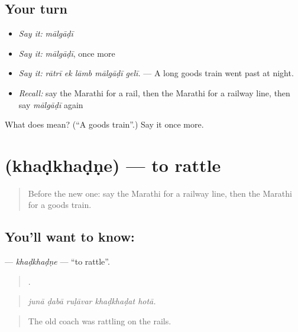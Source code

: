 \subsection*{Your turn}
\begin{itemize}
\raggedright
  \item \emph{Say it:} \emph{mālgāḍī}
  \item \emph{Say it:} \emph{mālgāḍī}, once more
  \item \emph{Say it:} \emph{rātrī ek lāmb mālgāḍī gelī.} — A long goods train went past at night.
  \item \emph{Recall:} say the Marathi for a rail, then the Marathi for a railway line, then say \emph{mālgāḍī} again
\end{itemize}

\begin{tcolorbox}[breakable,colback=teal!4,colframe=teal!35!black,title={Before you move on}]
What does  mean? (\textquotedblleft{}A goods train\textquotedblright{}.) Say it once more.
\end{tcolorbox}
\section[\texorpdfstring{\mr{खडखडणे} (khaḍkhaḍṇe)}{खडखडणे (khaḍkhaḍṇe)}]{ (khaḍkhaḍṇe) — to rattle}

\label{lesson:MR-C396-khadkhadne}



\begin{quote}
Before the new one: say the Marathi for a railway line, then the Marathi for a goods train.
\end{quote}

\subsection*{You'll want to know: }
\textbf{} — \emph{khaḍkhaḍṇe} — \textquotedblleft{}to rattle\textquotedblright{}.

\begin{quote}
    .
\end{quote}

\begin{quote}
\emph{junā ḍabā ruḷāvar khaḍkhaḍat hotā.}
\end{quote}

\begin{quote}
The old coach was rattling on the rails.
\end{quote}

